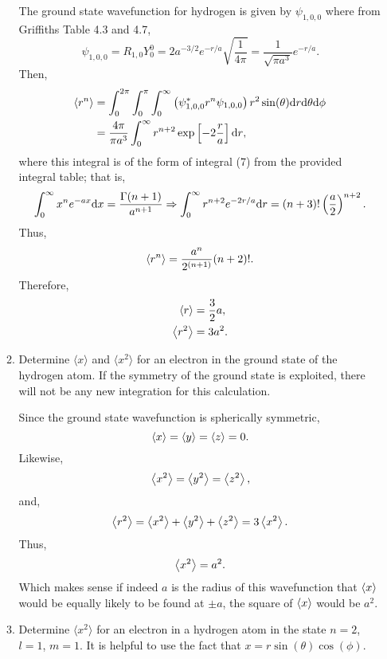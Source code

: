\documentclass[a4paper, 12pt]{config/homework}
\begin{document}
\begin{enumerate}
\begin{enumerate}[label=(\alph*)]
The ground state wavefunction for hydrogen is given by \(\psi_{1,0,0}\) where from Griffiths Table 4.3 and 4.7,
\[\psi_{1,0,0} = R_{1,0}Y_0^0 = 2a^{-3/2}e^{-r/a}\sqrt{\frac{1}{4\pi}} = \frac{1}{\sqrt{\pi a^3}}e^{-r/a}.\]
Then,
\begin{align*}
\left\langle r^n \right\rangle &= \int_{0}^{2\pi}{\int_{0}^{\pi}{\int_{0}^{\infty}{\left(\psi_{1,0,0}^* r^n \psi_{1,0,0}\right) r^2\sin(\theta) \text{d}r} \text{d}\theta} \text{d}\phi}
\\&= \frac{4\pi}{\pi a^3} \int_{0}^{\infty}{r^{n+2} \exp\left[-2\frac{r}{a}\right] \text{d}r},
\end{align*}
where this integral is of the form of integral (7) from the provided integral table; that is,
\[\int_{0}^{\infty}{x^n e^{-ax} \text{d}x}=\frac{\Gamma(n+1)}{a^{n+1}}
\Rightarrow \int_{0}^{\infty}{r^{n+2} e^{-2r/a} \text{d}r} = (n+3)! \left(\frac{a}{2}\right)^{n+2}.\]
Thus,
\[\left\langle r^n \right\rangle = \frac{a^n}{2^{(n+1)}}(n+2)!.\]
Therefore,
\begin{align*}
\left\langle r \right\rangle &= \frac{3}{2}a, \\
\left\langle r^2 \right\rangle &= 3a^2 .
\end{align*}

\item Determine \(\langle x \rangle\) and \(\langle x^2 \rangle\) for an electron in the ground state of the hydrogen atom. If the symmetry of the ground state is exploited, there will not be any new integration for this calculation. \bigskip

Since the ground state wavefunction is spherically symmetric,
\[\left\langle x \right\rangle=\left\langle y \right\rangle=\left\langle z \right\rangle=0.\]
Likewise,
\[\left\langle x^2 \right\rangle=\left\langle y^2 \right\rangle=\left\langle z^2 \right\rangle,\]
and,
\[\left\langle r^2 \right\rangle=\left\langle x^2 \right\rangle + \left\langle y^2 \right\rangle + \left\langle z^2 \right\rangle = 3\left\langle x^2 \right\rangle.\]
Thus,
\[\left\langle x^2 \right\rangle = a^2.\]
Which makes sense if indeed \(a\) is the radius of this wavefunction that \(\left\langle x \right\rangle\) would be equally likely to be found at \(\pm a\), the square of \(\left\langle x \right\rangle\) would be \(a^2\).
\bigskip
\item Determine \(\langle x^2 \rangle\) for an electron in a hydrogen atom in the state \(n=2\), \(l=1\), \(m=1\). It is helpful to use the fact that \(x=r\sin(\theta)\cos(\phi)\). \bigskip


\end{enumerate}
\end{enumerate}
\end{document}
